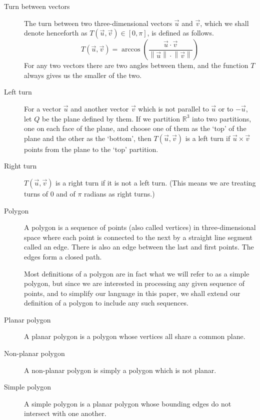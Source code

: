 \documentclass{article}
\newcommand{\len}[1]{\left\lVert #1 \right\rVert}
\begin{document}
\begin{description}
	\item[Turn between vectors]
		The turn between two three-dimensional vectors \(\vec{u}\) and \(\vec{v}\), which we shall denote henceforth as \(T(\vec{u}, \vec{v}) \in [0, \pi]\), is defined as follows.
		\begin{equation*}
			T(\vec{u}, \vec{v}) = \arccos \left( \frac{\vec{u} \cdot \vec{v}} {\len{\vec{u}} \cdot \len{\vec{v}}} \right)
		\end{equation*}
		For any two vectors there are two angles between them, and the function \(T\) always gives us the smaller of the two.

	\item[Left turn]
		For a vector \(\vec{u}\) and another vector \(\vec{v}\) which is not parallel to \(\vec{u}\) or to \(-\vec{u}\), let \(Q\) be the plane defined by them. If we partition \(\mathbb{R}^3\) into two partitions, one on each face of the plane, and choose one of them as the `top' of the plane and the other as the `bottom', then \(T(\vec{u}, \vec{v})\) is a left turn if \(\vec{u} \times \vec{v}\) points from the plane to the `top' partition.

	\item[Right turn]
		\(T(\vec{u}, \vec{v})\) is a right turn if it is not a left turn. (This means we are treating turns of 0 and of \(\pi\) radians as right turns.)

	\item[Polygon]
		A polygon is a sequence of points (also called vertices) in three-dimensional space where each point is connected to the next by a straight line segment called an edge. There is also an edge between the last and first points. The edges form a closed path.

		Most definitions of a polygon are in fact what we will refer to as a simple polygon, but since we are interested in processing any given sequence of points, and to simplify our language in this paper, we shall extend our definition of a polygon to include any such sequences.

	\item[Planar polygon]
		A planar polygon is a polygon whose vertices all share a common plane.

	\item[Non-planar polygon]
		A non-planar polygon is simply a polygon which is not planar.

	\item[Simple polygon]
		A simple polygon is a planar polygon whose bounding edges do not intersect with one another.


\end{description}
\end{document}
